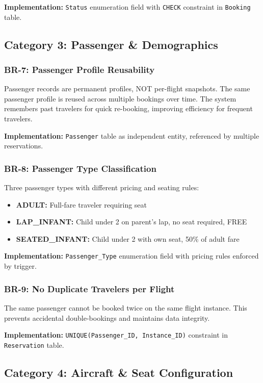 \documentclass[12pt,a4paper,openany]{report}
\begin{document}
\textbf{Implementation:} \texttt{Status} enumeration field with \texttt{CHECK} constraint in \texttt{Booking} table.

\subsection{Category 3: Passenger \& Demographics}

\subsubsection{BR-7: Passenger Profile Reusability}
Passenger records are permanent profiles, NOT per-flight snapshots. The same passenger profile is reused across multiple bookings over time. The system remembers past travelers for quick re-booking, improving efficiency for frequent travelers.

\textbf{Implementation:} \texttt{Passenger} table as independent entity, referenced by multiple reservations.

\subsubsection{BR-8: Passenger Type Classification}
Three passenger types with different pricing and seating rules:
\begin{itemize}
    \item \textbf{ADULT:} Full-fare traveler requiring seat
    \item \textbf{LAP\_INFANT:} Child under 2 on parent's lap, no seat required, FREE
    \item \textbf{SEATED\_INFANT:} Child under 2 with own seat, 50\% of adult fare
\end{itemize}

\textbf{Implementation:} \texttt{Passenger\_Type} enumeration field with pricing rules enforced by trigger.

\subsubsection{BR-9: No Duplicate Travelers per Flight}
The same passenger cannot be booked twice on the same flight instance. This prevents accidental double-bookings and maintains data integrity.

\textbf{Implementation:} \texttt{UNIQUE(Passenger\_ID, Instance\_ID)} constraint in \texttt{Reservation} table.

\subsection{Category 4: Aircraft \& Seat Configuration}
\end{document}
